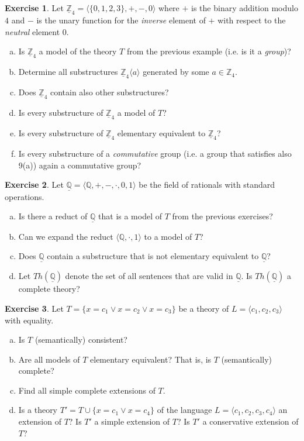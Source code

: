 \documentclass[11pt,a4paper]{amsart}
\theoremstyle{definition}
\newtheorem{problem}{Exercise}
\begin{document}
\smallskip\begin{problem}
Let $\underline{\mathbb{Z}}_4=\langle\{0,1,2,3\},+,-,0 \rangle$ where $+$ is the binary addition modulo $4$ and $-$ is the unary function for the \emph{inverse} element of $+$ with respect to the \emph{neutral} element $0$.
    \begin{enumerate}[(a)]
    \item Is $\underline{\mathbb{Z}}_4$ a model of the theory $T$ from the previous example (i.e. is it a \emph{group})?
    \item Determine all substructures $\underline{\mathbb{Z}}_4\langle a\rangle$ generated by some $a\in \mathbb{Z}_4$.
    \item Does $\underline{\mathbb{Z}}_4$ contain also other substructures?
    \item Is every substructure of $\underline{\mathbb{Z}}_4$ a model of $T$?
    \item Is every substructure of $\underline{\mathbb{Z}}_4$ elementary equivalent to $\underline{\mathbb{Z}}_4$?
    \item Is every substructure of a \emph{commutative} group (i.e. a group that  satisfies also 9(a)) again a commutative group?
    \end{enumerate}
\end{problem}  
    
\smallskip\begin{problem}Let $\underline{\mathbb{Q}}=\langle\mathbb{Q},+,-,\cdot,0,1 \rangle$ be the field of rationals with standard operations.
\begin{enumerate}[(a)]
\item Is there a reduct of $\underline{\mathbb{Q}}$ that is a model of $T$ from the previous exercises?
\item Can we expand the reduct $\langle\mathbb{Q},\cdot,1\rangle$  to a model of $T$?
\item Does $\underline{\mathbb{Q}}$ contain a substructure that is not elementary equivalent to $\underline{\mathbb{Q}}$?
\item Let $Th(\underline{\mathbb{Q}})$ denote the set of all sentences that are valid in $\underline{\mathbb{Q}}$. Is $Th(\underline{\mathbb{Q}})$ a complete theory?
\end{enumerate}
\end{problem}

\begin{problem}
Let $T=\{x=c_1 \vee x=c_2 \vee x=c_3\}$ be a theory of $L=\langle c_1,c_2,c_3\rangle$ with equality.
\begin{enumerate}[(a)]
\item Is $T$ (semantically) consistent?
\item Are all models of $T$ elementary equivalent? That is, is $T$ (semantically) complete?
\item Find all simple complete extensions of $T$.
\item Is a theory $T'=T\cup\{x=c_1 \vee x=c_4\}$ of the language $L=\langle c_1,c_2,c_3,c_4\rangle$ an extension of $T$? Is $T'$ a simple extension of $T$? Is $T'$ a conservative extension of $T$?
\end{enumerate}
\end{problem}
\end{document}
